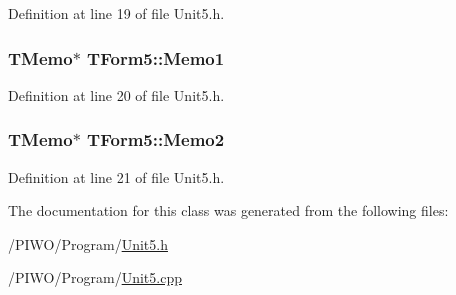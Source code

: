 Definition at line 19 of file Unit5.h.\hypertarget{classTForm5_e6f9741559010fe57ae0a98b45dcebab}{
\subsubsection[Memo1]{\setlength{\rightskip}{0pt plus 5cm}TMemo$\ast$ {\bf TForm5::Memo1}}}
\label{classTForm5_e6f9741559010fe57ae0a98b45dcebab}




Definition at line 20 of file Unit5.h.\hypertarget{classTForm5_5b17387dca79a87f7716ce922e74bce0}{
\subsubsection[Memo2]{\setlength{\rightskip}{0pt plus 5cm}TMemo$\ast$ {\bf TForm5::Memo2}}}
\label{classTForm5_5b17387dca79a87f7716ce922e74bce0}




Definition at line 21 of file Unit5.h.

The documentation for this class was generated from the following files:\begin{CompactItemize}
\item 
/PIWO/Program/\hyperlink{Unit5_8h}{Unit5.h}\item 
/PIWO/Program/\hyperlink{Unit5_8cpp}{Unit5.cpp}\end{CompactItemize}
